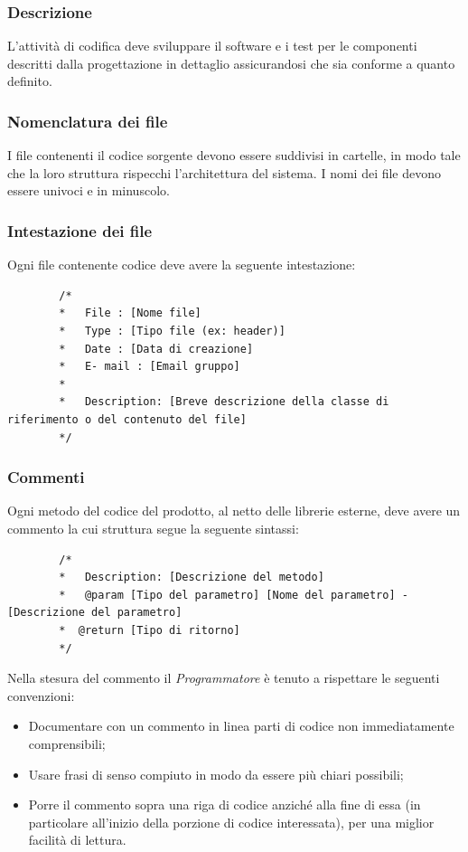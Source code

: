 \documentclass[../NomeDocumento.tex]{subfiles}
\begin{document}
	\subsubsection{Descrizione}
	L'attività di codifica deve sviluppare il software e i test per le componenti descritti dalla progettazione in dettaglio assicurandosi che sia conforme a quanto definito. 
	
	\subsubsection{Nomenclatura dei file}
	I file contenenti il codice sorgente devono essere suddivisi in cartelle, in modo tale che la
	loro struttura rispecchi l’architettura del sistema. I nomi dei file devono essere univoci
	e in minuscolo.
	
	\subsubsection{Intestazione dei file}
	Ogni file contenente codice deve avere la seguente intestazione:
	
	\begin{verbatim}
		/*
		* 	File : [Nome file]
		* 	Type : [Tipo file (ex: header)]
		* 	Date : [Data di creazione]
		* 	E- mail : [Email gruppo]
		* 	
		* 	Description: [Breve descrizione della classe di riferimento o del contenuto del file]
		*/
	\end{verbatim}

	\subsubsection{Commenti}
	Ogni metodo del codice del prodotto, al netto delle librerie esterne, deve avere un commento la cui struttura segue la seguente sintassi:
	
	\begin{verbatim}
		/*
		* 	Description: [Descrizione del metodo]
		* 	@param [Tipo del parametro] [Nome del parametro] - [Descrizione del parametro]
		*  @return [Tipo di ritorno]
		*/
	\end{verbatim}

	\noindent Nella stesura del commento il \textit{Programmatore} è tenuto a rispettare le seguenti convenzioni:
	\begin{itemize}
		\item Documentare con un commento in linea parti di codice non immediatamente comprensibili;
		\item Usare frasi di senso compiuto in modo da essere più chiari possibili;
		\item Porre il commento sopra una riga di codice anziché alla fine di essa (in particolare all’inizio della porzione di codice interessata), per una miglior facilità
		di lettura.
	\end{itemize}
	
\end{document}
